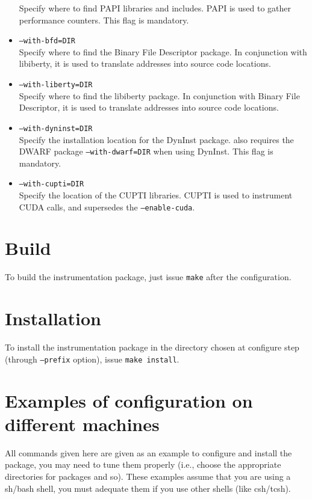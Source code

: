 \begin{itemize}
	Specify where to find PAPI libraries and includes. PAPI is used to gather performance counters. This flag is mandatory.
	\item {\tt --with-bfd=DIR} \\
	Specify where to find the Binary File Descriptor package. In conjunction with libiberty, it is used to translate addresses into source code locations.
	\item {\tt --with-liberty=DIR} \\
	Specify where to find the libiberty package. In conjunction with Binary File Descriptor, it is used to translate addresses into source code locations.
  \item {\tt --with-dyninst=DIR} \\
  Specify the installation location for the DynInst package. \TRACE also requires the DWARF package {\tt --with-dwarf=DIR} when using DynInst. This flag is mandatory.
  \item {\tt --with-cupti=DIR} \\
  Specify the location of the CUPTI libraries. CUPTI is used to instrument CUDA calls, and supersedes the {\tt --enable-cuda}.
\end{itemize}

\section{Build}

To build the instrumentation package, just issue {\tt make} after the configuration.

\section{Installation}

To install the instrumentation package in the directory chosen at configure step (through {\tt --prefix} option), issue {\tt make install}.

\section{Examples of configuration on different machines}

All commands given here are given as an example to configure and install the package, you may need to tune them properly (i.e., choose the appropriate directories for packages and so).  These examples assume that you are using a sh/bash shell, you must adequate them if you use other shells (like csh/tcsh).


